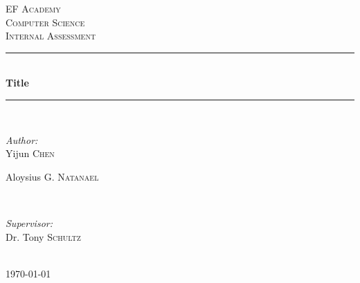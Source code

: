 \documentclass[12pt]{article} %
\begin{document}

\begin{titlepage}

\newcommand{\HRule}{\rule{\linewidth}{0.5mm}} %

\center %

\textsc{\LARGE EF Academy}\\[1.5cm] %
\textsc{\Large Computer Science}\\[0.5cm] %
\textsc{\large Internal Assessment}\\[0.5cm] %

\HRule \\[0.4cm]
{ \huge \bfseries Title}\\[0.4cm] %
\HRule \\[1.5cm]

\begin{minipage}{0.4\textwidth}
\begin{flushleft} \large
\emph{Author:}\\
Yijun \textsc{Chen} %

Aloysius \textsc{G. Natanael} %
\end{flushleft}
\end{minipage}
~
\begin{minipage}{0.4\textwidth}
\begin{flushright} \large
\emph{Supervisor:} \\
Dr. Tony \textsc{Schultz} %
\end{flushright}
\end{minipage}\\[4cm]

{\large \today}\\[3cm] %


\vfill %

\end{titlepage}
\end{document}
